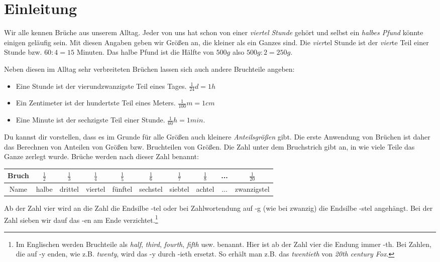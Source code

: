 	\section{Einleitung}\vspace{-1em}
Wir alle kennen Brüche aus unserem Alltag. Jeder von uns hat schon von einer \emph{viertel Stunde} gehört und selbst ein \emph{halbes Pfund} könnte einigen geläufig sein. Mit diesen Angaben geben wir Größen an, die kleiner als ein Ganzes sind. Die \emph{vier}tel Stunde ist der \emph{vier}te Teil einer Stunde bzw. $60:4 = 15$ Minuten. Das halbe Pfund ist die Hälfte von $500g$ also $500g:2=250g$.

Neben diesen im Alltag sehr verbreiteten Brüchen lassen sich auch andere Bruchteile angeben:
\begin{itemize}[noitemsep]
	\item Eine Stunde ist der vierundzwanzigste Teil eines Tages. \hfill $\frac{1}{24}d=1h$
	\item Ein Zentimeter ist der hundertste Teil eines Meters. \hfill$\frac{1}{100}m=1cm$
	\item Eine Minute ist der sechzigste Teil einer Stunde. \hfill $\frac{1}{60}h=1min.$
\end{itemize}
Du kannst dir vorstellen, dass es im Grunde für alle Größen auch kleinere \emph{Anteilsgrößen} gibt. Die erste Anwendung von Brüchen ist daher das Berechnen von Anteilen von Größen bzw. Bruchteilen von Größen. Die Zahl unter dem Bruchstrich gibt an, in wie viele Teile das Ganze zerlegt wurde. Brüche werden nach dieser Zahl benannt:
\begin{center}
	\begin{tabular}{c|c|c|c|c|c|c|c|c|c}
		Bruch & $\frac{1}{2}$ & $\frac{1}{3}$ & $\frac{1}{4}$ & $\frac{1}{5}$ & $\frac{1}{6}$ & $\frac{1}{7}$ & $\frac{1}{8}$ & ... & $\frac{1}{20}$ \\ \hline
		Name  & halbe              & drittel & viertel & fünftel & sechstel & siebtel & achtel &... & zwanzigstel
	\end{tabular}
\end{center}
Ab der Zahl vier wird an die Zahl die Endsilbe \glqq{}-tel\grqq{} oder bei Zahlwortendung auf \glqq{}-g\grqq{} (wie bei zwanzig) die Endsilbe \glqq{}-stel\grqq{} angehängt. Bei der Zahl sieben wir dauf das \glqq{}-en\grqq{} am Ende verzichtet.\footnote{Im Englischen werden Bruchteile als \emph{half}, \emph{third}, \emph{fourth}, \emph{fifth} usw. benannt. Hier ist ab der Zahl vier die Endung immer \glqq-th\grqq{}. Bei Zahlen, die auf \glqq{}-y\grqq{} enden, wie z.B. \emph{twenty}, wird das \glqq{}-y\grqq{} durch \glqq{}-ieth\grqq{} ersetzt. So erhält man z.B. das \emph{twentieth} von \emph{20th century Fox}.}